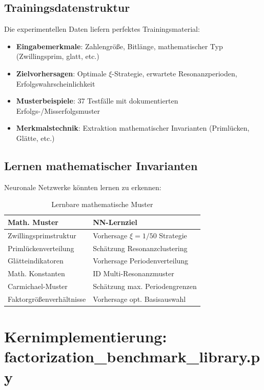 	\subsection{Trainingsdatenstruktur}
	
	Die experimentellen Daten liefern perfektes Trainingsmaterial:
	
	\begin{itemize}
		\item \textbf{Eingabemerkmale}: Zahlengröße, Bitlänge, mathematischer Typ (Zwillingsprim, glatt, etc.)
		\item \textbf{Zielvorhersagen}: Optimale $\xi$-Strategie, erwartete Resonanzperioden, Erfolgswahrscheinlichkeit
		\item \textbf{Musterbeispiele}: 37 Testfälle mit dokumentierten Erfolgs-/Misserfolgsmuster
		\item \textbf{Merkmalstechnik}: Extraktion mathematischer Invarianten (Primlücken, Glätte, etc.)
	\end{itemize}
	
	\subsection{Lernen mathematischer Invarianten}
	
	Neuronale Netzwerke könnten lernen zu erkennen:
	
	\begin{table}[H]
		\centering
		\caption{Lernbare mathematische Muster}
		\begin{tabular}{ll}
			\toprule
			\textbf{Math. Muster} & \textbf{NN-Lernziel} \\
			\midrule
			Zwillingsprimstruktur & Vorhersage $\xi = 1/50$ Strategie \\
			Primlückenverteilung & Schätzung Resonanzclustering \\
			Glätteindikatoren & Vorhersage Periodenverteilung \\
			Math. Konstanten & ID Multi-Resonanzmuster \\
			Carmichael-Muster & Schätzung max. Periodengrenzen \\
			Faktorgrößenverhältnisse & Vorhersage opt. Basisauswahl \\
			\bottomrule
		\end{tabular}
		\label{tab:learnable_patterns}
	\end{table}
	
	\section{Kernimplementierung: factorization\_benchmark\_library.py}
	

